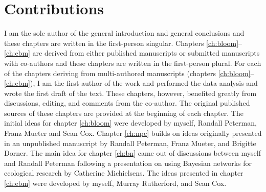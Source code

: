 \section{Contributions}

I am the sole author of the general introduction and general conclusions and
these chapters are written in the first-person singular. Chapters
\ref{ch:bloom}--\ref{ch:ebm} are derived from either published manuscripts or
submitted manuscripts with co-authors and these chapters are written in the
first-person plural. For each of the chapters deriving from multi-authored
manuscripts (chapters \ref{ch:bloom}--\ref{ch:ebm}), I am the first-author of
the work and performed the data analysis and wrote the first draft of the text.
These chapters, however, benefited greatly from discussions, editing, and
comments from the co-author. The original published sources of these chapters
are provided at the beginning of each chapter. The initial ideas for chapter
\ref{ch:bloom} were developed by myself, Randall Peterman, Franz Mueter and Sean
Cox. Chapter \ref{ch:npc} builds on ideas originally presented in an unpublished
manuscript by Randall Peterman, Franz Mueter, and Brigitte Dorner. The main idea
for chapter \ref{ch:bn} came out of discussions between myself and Randall
Peterman following a presentation on using Bayesian networks for ecological
research by Catherine Michielsens. The ideas presented in chapter \ref{ch:ebm}
were developed by myself, Murray Rutherford, and Sean Cox.

